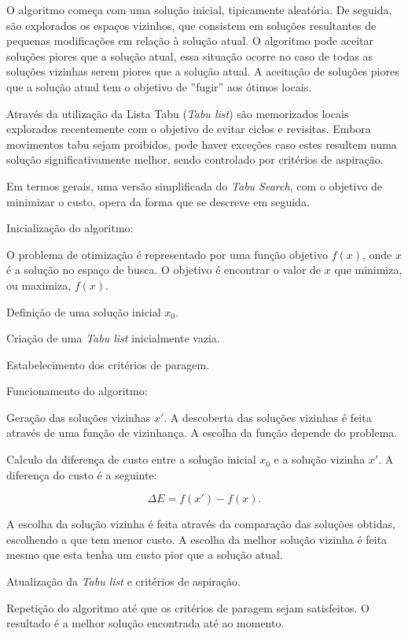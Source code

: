 O algoritmo começa com uma solução inicial, tipicamente aleatória. De seguida, são explorados os espaços vizinhos, que consistem em soluções resultantes de pequenas modificações em relação à solução atual. O algoritmo pode aceitar soluções piores que a solução atual, essa situação ocorre no caso de todas as soluções vizinhas serem piores que a solução atual. A aceitação de soluções piores que a solução atual tem o objetivo de ''fugir'' aos ótimos locais.

Através da utilização da Lista Tabu (\textit{Tabu list}) são memorizados locais explorados recentemente com o objetivo de evitar ciclos e revisitas. Embora movimentos tabu sejam proibidos, pode haver exceções caso estes resultem numa solução significativamente melhor, sendo controlado por critérios de aspiração.

Em termos gerais, uma versão simplificada do \textit{Tabu Search}, com o objetivo de minimizar o custo, opera da forma que se descreve em seguida.

Inicialização do algoritmo:

\begin{compactitem}
    \item O problema de otimização é representado por uma função objetivo $f(x)$, onde $x$ é a solução no espaço de busca. O objetivo é encontrar o valor de $x$ que minimiza, ou maximiza, $f(x)$.

    \item Definição de uma solução inicial $x_0$.
    
    \item Criação de uma \textit{Tabu list} inicialmente vazia.

    \item Estabelecimento dos critérios de paragem.
\end{compactitem}

Funcionamento do algoritmo:

\begin{compactitem}
    \item Geração das soluções vizinhas $x'$. A descoberta das soluções vizinhas é feita através de uma função de vizinhança. A escolha da função depende do problema.

    \item Calculo da diferença de custo entre a solução inicial $x_0$ e a solução vizinha $x'$. A diferença do custo é a seguinte:

    \begin{equation}
        \Delta E = f(x') - f(x).
    \end{equation}

    A escolha da solução vizinha é feita através da comparação das soluções obtidas, escolhendo a que tem menor custo. A escolha da melhor solução vizinha é feita mesmo que esta tenha um custo pior que a solução atual.

    \item Atualização da \textit{Tabu list} e critérios de aspiração.
    
    \item Repetição do algoritmo até que os critérios de paragem sejam satisfeitos. O resultado é a melhor solução encontrada até ao momento.
\end{compactitem}

